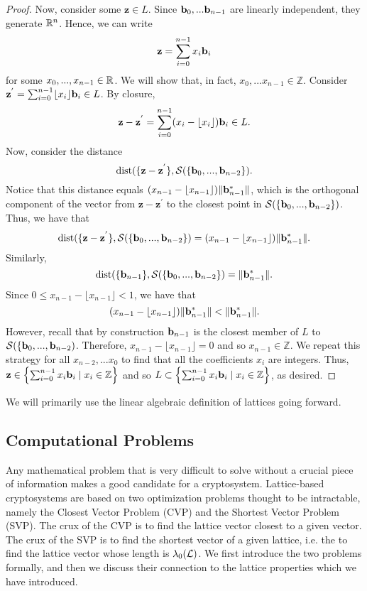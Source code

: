 \documentclass[a4paper,12pt]{article}
\begin{document}
\begin{proof}
Now, consider some $\mathbf{z} \in L$. Since $\mathbf{b}_0,...\mathbf{b}_{n-1}$ are linearly independent, they generate $\mathbb{R}^n$. Hence, we can write $$\mathbf{z} = \sum_{i=0}^{n-1}x_{i}\mathbf{b}_{i}$$ for some $x_0,...,x_{n-1} \in \mathbb{R}$. We will show that, in fact, $x_0,...x_{n-1} \in \mathbb{Z}$. Consider $\mathbf{z}^{'} = \sum_{i=0}^{n-1}\lfloor x_i \rfloor\mathbf{b}_i \in L$. By closure, $$\mathbf{z} - \mathbf{z}^{'} = \sum_{i=0}^{n-1}(x_{i} - \lfloor x_{i}\rfloor)\mathbf{b}_i \in L.$$ Now, consider the distance  $$\text{dist}(\lbrace\mathbf{z}-\mathbf{z}^{'}\rbrace, \mathcal{S}(\lbrace\mathbf{b}_0,...,\mathbf{b}_{n-2}\rbrace).$$ Notice that this distance equals $(x_{n-1}-\lfloor x_{n-1}\rfloor)\|\mathbf{b}_{n-1}^{*}\|$, which is the orthogonal component of the vector from $\mathbf{z} - \mathbf{z}^'$ to the closest point in $\mathcal{S}(\lbrace \mathbf{b}_0,...,\mathbf{b}_{n-2}\rbrace)$. Thus, we have that $$\text{dist}(\lbrace\mathbf{z}-\mathbf{z}^{'}\rbrace, \mathcal{S}(\lbrace\mathbf{b}_0,...,\mathbf{b}_{n-2}\rbrace) = (x_{n-1}-\lfloor x_{n-1}\rfloor)\|\mathbf{b}_{n-1}^{*}\|.$$ Similarly, $$\text{dist}(\lbrace\mathbf{b}_{n-1}\rbrace, \mathcal{S}(\lbrace\mathbf{b}_0,...,\mathbf{b}_{n-2}\rbrace) = \|\mathbf{b}_{n-1}^*\|.$$ Since $0 \leq x_{n-1}-\lfloor x_{n-1}\rfloor < 1$, we have that $$(x_{n-1}-\lfloor x_{n-1}\rfloor)\|\mathbf{b}_{n-1}^{*}\| < \|\mathbf{b}_{n-1}^{*}\|.$$ However, recall that by construction $\mathbf{b}_{n-1}$ is the closest member of $L$ to $\mathcal{S}(\lbrace\mathbf{b}_0,...,\mathbf{b}_{n-2})$. Therefore, $x_{n-1}-\lfloor x_{n-1}\rfloor = 0$ and so $x_{n-1} \in \mathbb{Z}$. We repeat this strategy for all $x_{n-2},...x_0$ to find that all the coefficients $x_i$ are integers. Thus, $\mathbf{z} \in \left\{ \sum_{i=0}^{n-1} x_{i}\mathbf{b}_{i} \mid x_{i} \in \mathbb{Z} \right\}$ and so $L \subset \left\{ \sum_{i=0}^{n-1} x_{i}\mathbf{b}_{i} \mid x_{i} \in \mathbb{Z} \right\}$, as desired.
\end{proof}

We will primarily use the linear algebraic definition of lattices going forward. 

\subsection{Computational Problems} 
Any mathematical problem that is very difficult to solve without a crucial piece of information makes a good candidate for a cryptosystem. Lattice-based cryptosystems are based on two optimization problems thought to be intractable, namely the Closest Vector Problem (CVP) and the Shortest Vector Problem (SVP). The crux of the CVP is to find the lattice vector closest to a given vector. The crux of the SVP is to find the shortest vector of a given lattice, i.e. the to find the lattice vector whose length is $\lambda_{0}(\mathcal{L})$. We first introduce the two problems formally, and then we discuss their connection to the lattice properties which we have introduced.
\end{document}

